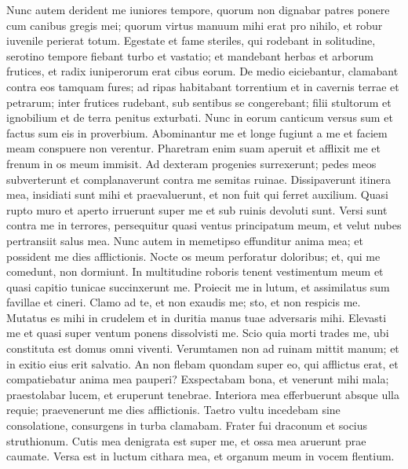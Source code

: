 \begin{biblechapter}  
\verse Nunc autem derident me iuniores tempore, quorum non dignabar patres ponere cum canibus gregis mei; 
\verse quorum virtus manuum mihi erat pro nihilo, et robur iuvenile perierat totum. 
\verse Egestate et fame steriles, qui rodebant in solitudine, serotino tempore fiebant turbo et vastatio; 
\verse et mandebant herbas et arborum frutices, et radix iuniperorum erat cibus eorum. 
\verse De medio eiciebantur, clamabant contra eos tamquam fures; 
\verse ad ripas habitabant torrentium et in cavernis terrae et petrarum; 
\verse inter frutices rudebant, sub sentibus se congerebant; 
\verse filii stultorum et ignobilium et de terra penitus exturbati. 
\verse Nunc in eorum canticum versus sum et factus sum eis in proverbium. 
\verse Abominantur me et longe fugiunt a me et faciem meam conspuere non verentur. 
\verse Pharetram enim suam aperuit et afflixit me et frenum in os meum immisit. 
\verse Ad dexteram progenies surrexerunt; pedes meos subverterunt et complanaverunt contra me semitas ruinae. 
\verse Dissipaverunt itinera mea, insidiati sunt mihi et praevaluerunt, et non fuit qui ferret auxilium. 
\verse Quasi rupto muro et aperto irruerunt super me et sub ruinis devoluti sunt. 
\verse Versi sunt contra me in terrores, persequitur quasi ventus principatum meum, et velut nubes pertransiit salus mea. 
\verse Nunc autem in memetipso effunditur anima mea; et possident me dies afflictionis. 
\verse Nocte os meum perforatur doloribus; et, qui me comedunt, non dormiunt. 
\verse In multitudine roboris tenent vestimentum meum et quasi capitio tunicae succinxerunt me. 
\verse Proiecit me in lutum, et assimilatus sum favillae et cineri. 
\verse Clamo ad te, et non exaudis me; sto, et non respicis me. 
\verse Mutatus es mihi in crudelem et in duritia manus tuae adversaris mihi. 
\verse Elevasti me et quasi super ventum ponens dissolvisti me. 
\verse Scio quia morti trades me, ubi constituta est domus omni viventi. 
\verse Verumtamen non ad ruinam mittit manum; et in exitio eius erit salvatio. 
\verse An non flebam quondam super eo, qui afflictus erat, et compatiebatur anima mea pauperi? 
\verse Exspectabam bona, et venerunt mihi mala; praestolabar lucem, et eruperunt tenebrae. 
\verse Interiora mea efferbuerunt absque ulla requie; praevenerunt me dies afflictionis. 
\verse Taetro vultu incedebam sine consolatione, consurgens in turba clamabam. 
\verse Frater fui draconum et socius struthionum. 
\verse Cutis mea denigrata est super me, et ossa mea aruerunt prae caumate. 
\verse Versa est in luctum cithara mea, et organum meum in vocem flentium. 
\end{biblechapter}

